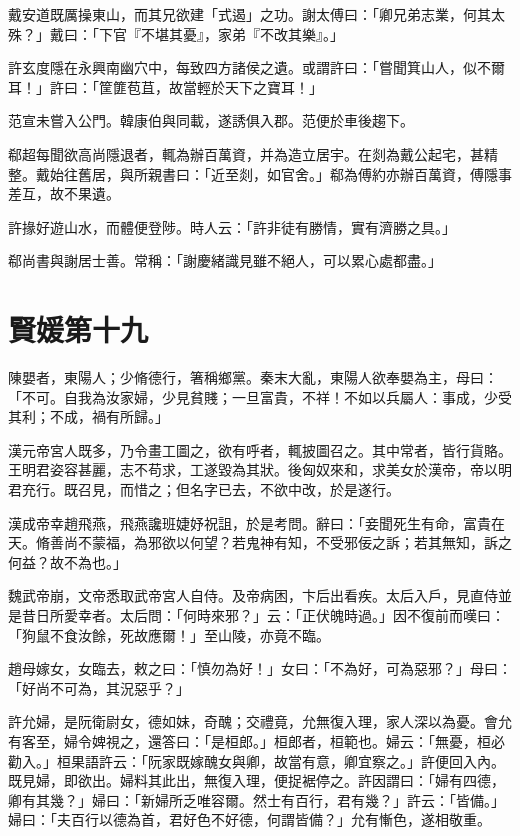 戴安道既厲操東山，而其兄欲建「式遏」之功。謝太傅曰：「卿兄弟志業，何其太殊？」戴曰：「下官『不堪其憂』，家弟『不改其樂』。」

許玄度隱在永興南幽穴中，每致四方諸侯之遺。或謂許曰：「嘗聞箕山人，似不爾耳！」許曰：「筐篚苞苴，故當輕於天下之寶耳！」

范宣未嘗入公門。韓康伯與同載，遂誘俱入郡。范便於車後趨下。

郗超每聞欲高尚隱退者，輒為辦百萬資，并為造立居宇。在剡為戴公起宅，甚精整。戴始往舊居，與所親書曰：「近至剡，如官舍。」郗為傅約亦辦百萬資，傅隱事差互，故不果遺。

許掾好遊山水，而體便登陟。時人云：「許非徒有勝情，實有濟勝之具。」

郗尚書與謝居士善。常稱：「謝慶緒識見雖不絕人，可以累心處都盡。」



\chapter{賢媛第十九}

陳嬰者，東陽人；少脩德行，箸稱鄉黨。秦末大亂，東陽人欲奉嬰為主，母曰：「不可。自我為汝家婦，少見貧賤；一旦富貴，不祥！不如以兵屬人：事成，少受其利；不成，禍有所歸。」

漢元帝宮人既多，乃令畫工圖之，欲有呼者，輒披圖召之。其中常者，皆行貨賂。王明君姿容甚麗，志不苟求，工遂毀為其狀。後匈奴來和，求美女於漢帝，帝以明君充行。既召見，而惜之；但名字已去，不欲中改，於是遂行。

漢成帝幸趙飛燕，飛燕讒班婕妤祝詛，於是考問。辭曰：「妾聞死生有命，富貴在天。脩善尚不蒙福，為邪欲以何望？若鬼神有知，不受邪佞之訴；若其無知，訴之何益？故不為也。」

魏武帝崩，文帝悉取武帝宮人自侍。及帝病困，卞后出看疾。太后入戶，見直侍並是昔日所愛幸者。太后問：「何時來邪？」云：「正伏魄時過。」因不復前而嘆曰：「狗鼠不食汝餘，死故應爾！」至山陵，亦竟不臨。

趙母嫁女，女臨去，敕之曰：「慎勿為好！」女曰：「不為好，可為惡邪？」母曰：「好尚不可為，其況惡乎？」

許允婦，是阮衛尉女，德如妹，奇醜；交禮竟，允無復入理，家人深以為憂。會允有客至，婦令婢視之，還答曰：「是桓郎。」桓郎者，桓範也。婦云：「無憂，桓必勸入。」桓果語許云：「阮家既嫁醜女與卿，故當有意，卿宜察之。」許便回入內。既見婦，即欲出。婦料其此出，無復入理，便捉裾停之。許因謂曰：「婦有四德，卿有其幾？」婦曰：「新婦所乏唯容爾。然士有百行，君有幾？」許云：「皆備。」婦曰：「夫百行以德為首，君好色不好德，何謂皆備？」允有慚色，遂相敬重。


